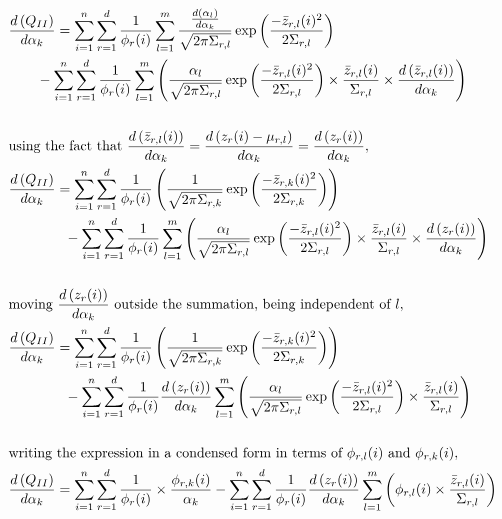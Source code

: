 \documentclass[]{article}
\begin{document}
\begin{align*}
& \der{\alpha_k}{Q_{II}}= \sum\limits_{i=1}^n \sum\limits_{r=1}^{d}\frac{1}{\phi_r(i)} \sum\limits_{l=1}^{m}  \frac{\der{\alpha_k}{\alpha_l}}{\sqrt{2\pi\Sigma_{r,l}}} \exp\left( \frac{-\bar{z}_{r,l}(i)^2}{2\Sigma_{r,l}}\right) \\  
& \qquad - \sum\limits_{i=1}^n \sum\limits_{r=1}^{d}\frac{1}{\phi_r(i)} \sum\limits_{l=1}^{m}\left(\frac{\alpha_l}{\sqrt{2\pi\Sigma_{r,l}}} \exp\left( \frac{-\bar{z}_{r,l}(i)^2}{2\Sigma_{r,l}}\right) \times \frac{\bar{z}_{r,l}(i)}{\Sigma_{r,l}}\times \der{\alpha_k}{\bar{z}_{r,l}(i)} \right) \\ \\
& \text{using the fact that } \der{\alpha_k}{\bar{z}_{r,l}(i)} = \der{\alpha_k}{z_r(i)-\mu_{r,l}} = \der{\alpha_k}{z_r(i)}, \\
& \der{\alpha_k}{Q_{II}}= \sum\limits_{i=1}^n \sum\limits_{r=1}^{d}\frac{1}{\phi_r(i)} \left(\frac{1}{\sqrt{2\pi\Sigma_{r,k}}} \exp\left( \frac{-\bar{z}_{r,k}(i)^2}{2\Sigma_{r,k}}\right)\right)  \\ 
& \qquad \qquad - \sum\limits_{i=1}^n \sum\limits_{r=1}^{d}\frac{1}{\phi_r(i)} \sum\limits_{l=1}^{m} \left( \frac{\alpha_l}{\sqrt{2\pi\Sigma_{r,l}}} \exp\left( \frac{-\bar{z}_{r,l}(i)^2}{2\Sigma_{r,l}}\right) \times \frac{\bar{z}_{r,l}(i)}{\Sigma_{r,l}}\times \der{\alpha_k}{z_{r}(i)}\right) \\ \\
& \text{moving } \der{\alpha_k}{z_r(i)} \text{ outside the summation, being independent of } l,\\
& \der{\alpha_k}{Q_{II}}= \sum\limits_{i=1}^n \sum\limits_{r=1}^{d}\frac{1}{\phi_r(i)} \left(\frac{1}{\sqrt{2\pi\Sigma_{r,k}}} \exp\left( \frac{-\bar{z}_{r,k}(i)^2}{2\Sigma_{r,k}}\right)\right) \nonumber \\ 
& \qquad \qquad - \sum\limits_{i=1}^n \sum\limits_{r=1}^{d}\frac{1}{\phi_r(i)} \der{\alpha_k}{z_r(i)} \sum\limits_{l=1}^{m} \left( \frac{\alpha_l}{\sqrt{2\pi\Sigma_{r,l}}} \exp\left( \frac{-\bar{z}_{r,l}(i)^2}{2\Sigma_{r,l}}\right) \times \frac{\bar{z}_{r,l}(i)}{\Sigma_{r,l}} \right) \\ \\
&\text{writing the expression in a condensed form in terms of } \phi_{r,l}(i) \text{ and } \phi_{r,k}(i), \\
& \der{\alpha_k}{Q_{II}} = \sum\limits_{i=1}^n \sum\limits_{r=1}^{d}\frac{1}{\phi_r(i)} \times \frac{\phi_{r,k}(i)}{\alpha_k} - \sum\limits_{i=1}^n \sum\limits_{r=1}^{d}\frac{1}{\phi_r(i)} \der{\alpha_k}{z_r(i)} \sum\limits_{l=1}^{m} \left( \phi_{r,l}(i) \times \frac{\bar{z}_{r,l}(i)}{\Sigma_{r,l}} \right) 
\end{align*}
\end{document}
